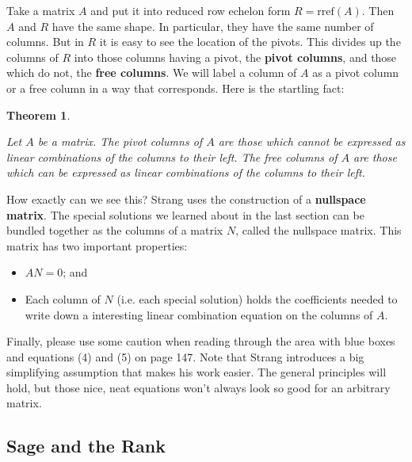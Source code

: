 \documentclass[10pt,]{book}
\newcommand{\terminology}[1]{\textbf{#1}}
\theoremstyle{plain}
\newtheorem{theorem}{Theorem}[chapter]
\theoremstyle{definition}
\numberwithin{equation}{section}
\begin{document}
      Take a matrix \(A\) and put it into reduced row echelon form
      \(R = \mathrm{rref}(A)\). Then \(A\) and \(R\) have the same shape.
      In particular, they have the same number of columns. But in \(R\)
      it is easy to see the location of the pivots. This divides up the
      columns of \(R\) into those columns having a pivot, the \terminology{pivot columns},
      and those which do not, the \terminology{free columns}.
      We will label a column of \(A\) as a pivot column or a free column in a way
      that corresponds. Here is the startling fact:
\begin{theorem}\label{theorem-3}

        Let \(A\) be a matrix.
        The pivot columns of \(A\) are those which cannot be expressed as linear
        combinations of the columns to their left.
        The free columns of \(A\) are those which can be expressed as linear
        combinations of the columns to their left.
      \end{theorem}
\par

      How exactly can we see this? Strang uses the construction of a
      \terminology{nullspace matrix}. The special solutions we learned about
      in the last section can be bundled together as the columns of a matrix
      \(N\), called the nullspace matrix. This matrix has two important
      properties:
\begin{itemize}
\item{} \(AN = 0\); and\item{} Each column of \(N\) (i.e. each special solution) holds the
          coefficients needed to write down a interesting linear combination
          equation on the columns of \(A\).
        \end{itemize}
\par

        Finally, please use some caution when reading through the area
        with blue boxes and equations (4) and (5) on page 147. Note that
        Strang introduces a big simplifying assumption that makes his work
        easier. The general principles will hold, but those nice, neat
        equations won't always look so good for an arbitrary matrix.
\typeout{************************************************}
\typeout{************************************************}
\subsection[Sage and the Rank]{Sage and the Rank}\label{subsection-71}
\end{document}
